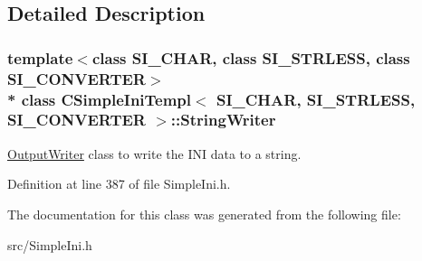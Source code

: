 \subsection{Detailed Description}
\subsubsection*{template$<$class S\+I\+\_\+\+C\+H\+AR, class S\+I\+\_\+\+S\+T\+R\+L\+E\+SS, class S\+I\+\_\+\+C\+O\+N\+V\+E\+R\+T\+ER$>$\\*
class C\+Simple\+Ini\+Templ$<$ S\+I\+\_\+\+C\+H\+A\+R, S\+I\+\_\+\+S\+T\+R\+L\+E\+S\+S, S\+I\+\_\+\+C\+O\+N\+V\+E\+R\+T\+E\+R $>$\+::\+String\+Writer}

\hyperlink{class_c_simple_ini_templ_1_1_output_writer}{Output\+Writer} class to write the I\+NI data to a string. 

Definition at line 387 of file Simple\+Ini.\+h.



The documentation for this class was generated from the following file\+:\begin{DoxyCompactItemize}
\item 
src/Simple\+Ini.\+h\end{DoxyCompactItemize}

